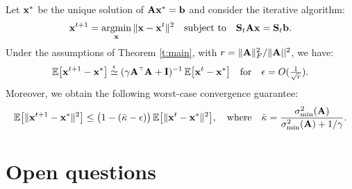 \documentclass[11pt]{article}
\begin{document}
\begin{corollary}\label{c:kaczmarz}
Let $\mathbf x^*$ be the unique solution of $\mathbf A\mathbf x^*=\mathbf b$ and consider
  the iterative algorithm:
  \begin{align*}
    \mathbf x^{t+1} = \operatorname*{\mathop{\mathrm{argmin}}}_\mathbf x\|\mathbf x-\mathbf x^t\|^2\quad\textnormal{subject to}\quad\mathbf{S}_t\mathbf A\mathbf x=\mathbf{S}_t\mathbf b.
  \end{align*}
Under the assumptions of Theorem \ref{t:main}, with $r=\|\mathbf A\|_F^2/\|\mathbf A||^2$, we have:
  \begin{align*}
    \E\big[\x^{t+1}-\x^*\big] \overset\epsilon\simeq 
    (\gamma\A^\top\A+\I)^{-1}\,\E\big[\x^t-\x^*\big]
    \quad\text{for}\quad\epsilon=O(\tfrac1{\sqrt r}). 
  \end{align*}
Moreover, we obtain the following worst-case convergence guarantee:
\begin{align}
  \mathbb E\big[\|\mathbf x^{t+1}-\mathbf x^*\|^2\big]
  \leq \big(1-
  (\bar\kappa-\epsilon)\big)\,\mathbb E\big[\|\mathbf x^{t}-\mathbf x^*\|^2\big],
  \quad\text{where}\quad
  \bar\kappa = \frac{\sigma_{\min}^2(\mathbf A)}{\sigma_{\min}^2(\mathbf A)+1/\gamma}.\label{eq:worst-case}
\end{align}
\end{corollary}


\section{Open questions}
\end{document}
